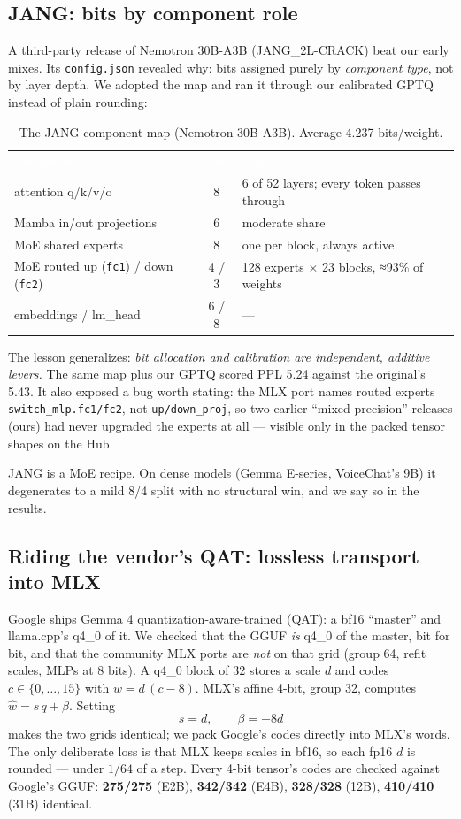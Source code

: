 \documentclass[10pt,letterpaper]{article}
\newcommand{\hd}[1]{\textcolor{white}{\interbold #1}}
\begin{document}
\subsection{JANG: bits by component role}

A third-party release of Nemotron 30B-A3B (JANG\_2L-CRACK) beat our early mixes. Its \texttt{config.json} revealed why: bits assigned purely by \emph{component type}, not by layer depth. We adopted the map and ran it through our calibrated GPTQ instead of plain rounding:

\begin{table}[H]
\centering\small
\caption{The JANG component map (Nemotron 30B-A3B). Average 4.237 bits/weight.}
\begin{tabular}{lcl}
\rowcolor{thead}\hd{Component} & \hd{Bits} & \hd{Why}\\
attention q/k/v/o & 8 & 6 of 52 layers; every token passes through \\
Mamba in/out projections & 6 & moderate share \\
MoE shared experts & 8 & one per block, always active \\
MoE routed up (\texttt{fc1}) / down (\texttt{fc2}) & 4 / 3 & 128 experts × 23 blocks, ≈93\% of weights \\
embeddings / lm\_head & 6 / 8 & --- \\
\end{tabular}
\end{table}

The lesson generalizes: \emph{bit allocation and calibration are independent, additive levers.} The same map plus our GPTQ scored PPL 5.24 against the original's 5.43. It also exposed a bug worth stating: the MLX port names routed experts \texttt{switch\_mlp.fc1/fc2}, not \texttt{up/down\_proj}, so two earlier ``mixed-precision'' releases (ours) had never upgraded the experts at all --- visible only in the packed tensor shapes on the Hub.

JANG is a MoE recipe. On dense models (Gemma E-series, VoiceChat's 9B) it degenerates to a mild 8/4 split with no structural win, and we say so in the results.

\subsection{Riding the vendor's QAT: lossless transport into MLX}

Google ships Gemma 4 quantization-aware-trained (QAT): a bf16 ``master'' and llama.cpp's q4\_0 of it. We checked that the GGUF \emph{is} q4\_0 of the master, bit for bit, and that the community MLX ports are \emph{not} on that grid (group 64, refit scales, MLPs at 8 bits). A q4\_0 block of 32 stores a scale $d$ and codes $c\in\{0,\dots,15\}$ with $w=d\,(c-8)$. MLX's affine 4-bit, group 32, computes $\hat w=s\,q+\beta$. Setting
\[
s=d,\qquad \beta=-8d
\]
makes the two grids identical; we pack Google's codes directly into MLX's words. The only deliberate loss is that MLX keeps scales in bf16, so each fp16 $d$ is rounded --- under $1/64$ of a step. Every 4-bit tensor's codes are checked against Google's GGUF: \textbf{275/275} (E2B), \textbf{342/342} (E4B), \textbf{328/328} (12B), \textbf{410/410} (31B) identical.
\end{document}
